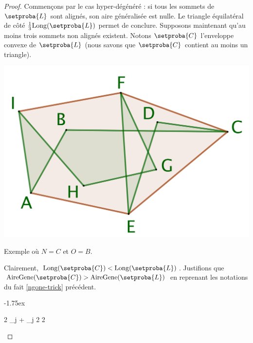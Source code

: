 \begin{proof}
	Commençons par le cas \og hyper-dégénéré \fg: si tous les sommets de $\setproba{L}$ sont alignés, son aire généralisée est nulle. Le triangle équilatéral de côté $\frac13 \perim{\setproba{L}}$ permet de conclure.
	Supposons maintenant qu'au moins trois sommets non alignés existent.
	Notons $\setproba{C}$ l'enveloppe convexe de $\setproba{L}$ (nous savons que $\setproba{C}$ contient au moins un triangle).
	
	\begin{center}
		\centering
		\small\itshape
		\includegraphics[scale=.4]{content/polygon/at-least-one/convex-hull.png}
		
		\smallskip
		Exemple où $N = C$ et $O = B$.
	\end{center}
	
		
	Clairement, $\perim{\setproba{C}} < \perim{\setproba{L}}$.
	Justifions que $\garea{\setproba{C}} > \garea{\setproba{L}}$ en reprenant les notations du fait \ref{ngone-trick} précédent.

    \smallskip
    
    \noindent\kern-1.75ex
    \begin{stepcalc}[style=ar*]
		2  
	\explnext{}
     	  \dsum_{j}   
	    + \dsum_{j} 
	\explnext{}
     	2 
	\explnext{}
     	2 
    \end{stepcalc}
	

\end{proof}
